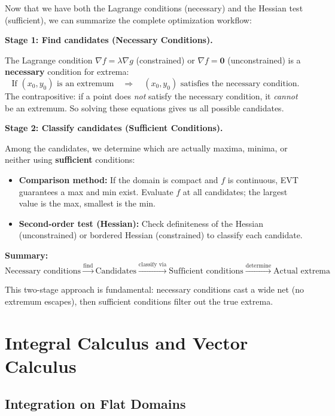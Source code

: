 \documentclass[11pt]{report}
\begin{document}
\begin{remark}
Now that we have both the Lagrange conditions (necessary) and the Hessian test (sufficient), we can summarize the complete optimization workflow:

\textbf{Stage 1: Find candidates (Necessary Conditions).}

The Lagrange condition $\nabla f = \lambda \nabla g$ (constrained) or $\nabla f = \mathbf{0}$ (unconstrained) is a \textbf{necessary} condition for extrema:
\[
\text{If } (x_0, y_0) \text{ is an extremum} \quad \Longrightarrow \quad (x_0, y_0) \text{ satisfies the necessary condition.}
\]
The contrapositive: if a point does \emph{not} satisfy the necessary condition, it \emph{cannot} be an extremum. So solving these equations gives us all possible candidates.

\textbf{Stage 2: Classify candidates (Sufficient Conditions).}

Among the candidates, we determine which are actually maxima, minima, or neither using \textbf{sufficient} conditions:
\begin{itemize}
    \item \textbf{Comparison method:} If the domain is compact and $f$ is continuous, EVT guarantees a max and min exist. Evaluate $f$ at all candidates; the largest value is the max, smallest is the min.
    \item \textbf{Second-order test (Hessian):} Check definiteness of the Hessian (unconstrained) or bordered Hessian (constrained) to classify each candidate.
\end{itemize}

\textbf{Summary:}
\[
\boxed{\text{Necessary conditions} \xrightarrow{\text{find}} \text{Candidates} \xrightarrow{\text{classify via}} \text{Sufficient conditions} \xrightarrow{\text{determine}} \text{Actual extrema}}
\]

This two-stage approach is fundamental: necessary conditions cast a wide net (no extremum escapes), then sufficient conditions filter out the true extrema.
\end{remark}

\newpage
\part{Integral Calculus and Vector Calculus}

\chapter{Integration on Flat Domains}
\end{document}
